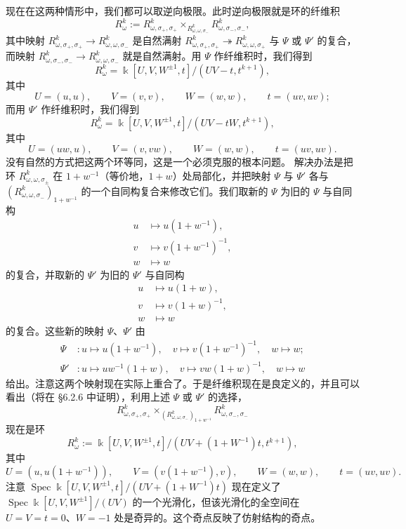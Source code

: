 现在在这两种情形中，我们都可以取逆向极限。此时逆向极限就是环的纤维积
\[
R^k_\omega:=R^k_{\omega,\sigma_+,\sigma_+}\times_{R^k_{\omega,\omega,\sigma_-}}R^k_{\omega,\sigma_-,\sigma_-},
\]
其中映射 $R^k_{\omega,\sigma_+,\sigma_+}\to R^k_{\omega,\omega,\sigma_-}$ 是自然满射 $R^k_{\omega,\sigma_+,\sigma_+}\twoheadrightarrow R^k_{\omega,\omega,\sigma_+}$ 与 $\Psi$ 或 $\Psi'$ 的复合，而映射 $R^k_{\omega,\sigma_-,\sigma_-}\to R^k_{\omega,\omega,\sigma_-}$ 就是自然满射。用 $\Psi$ 作纤维积时，我们得到
\[
R^k_\omega=\Bbbk[U,V,W^{\pm1},t]/(UV-t,t^{k+1}),
\]
其中
\[
U=(u,u),\qquad V=(v,v),\qquad W=(w,w),\qquad t=(uv,uv);
\]
而用 $\Psi'$ 作纤维积时，我们得到
\[
R^k_\omega=\Bbbk[U,V,W^{\pm1},t]/(UV-tW,t^{k+1}),
\]
其中
\[
U=(uw,u),\qquad V=(v,vw),\qquad W=(w,w),\qquad t=(uv,uv).
\]
没有自然的方式把这两个环等同，这是一个必须克服的根本问题。
解决办法是把环 $R^k_{\omega,\omega,\sigma_\pm}$ 在 $1+w^{-1}$（等价地，$1+w$）处局部化，并把映射 $\Psi$ 与 $\Psi'$ 各与 $(R^k_{\omega,\omega,\sigma_-})_{1+w^{-1}}$ 的一个自同构复合来修改它们。我们取新的 $\Psi$ 为旧的 $\Psi$ 与自同构
\begin{align*}
u&\mapsto u(1+w^{-1}),\\
v&\mapsto v(1+w^{-1})^{-1},\\
w&\mapsto w
\end{align*}
的复合，并取新的 $\Psi'$ 为旧的 $\Psi'$ 与自同构
\begin{align*}
u&\mapsto u(1+w),\\
v&\mapsto v(1+w)^{-1},\\
w&\mapsto w
\end{align*}
的复合。这些新的映射 $\Psi$、$\Psi'$ 由
\begin{align*}
\Psi&:u\mapsto u(1+w^{-1}),\quad v\mapsto v(1+w^{-1})^{-1},\quad w\mapsto w;\\
\Psi'&:u\mapsto uw^{-1}(1+w),\quad v\mapsto vw(1+w)^{-1},\quad w\mapsto w
\end{align*}
给出。注意这两个映射现在实际上重合了。于是纤维积现在是良定义的，并且可以看出（将在 §6.2.6 中证明），利用上述 $\Psi$ 或 $\Psi'$ 的选择，
\[
R^k_{\omega,\sigma_+,\sigma_+}\times_{(R^k_{\omega,\omega,\sigma_-})_{1+w^{-1}}}R^k_{\omega,\sigma_-,\sigma_-}
\]
现在是环
\[
R^k_\omega:=\Bbbk[U,V,W^{\pm1},t]/(UV+(1+W^{-1})t,t^{k+1}),
\]
其中
\[
U=(u,u(1+w^{-1})),\qquad V=(v(1+w^{-1}),v),\qquad W=(w,w),\qquad t=(uv,uv).
\]
注意 $\operatorname{Spec}\Bbbk[U,V,W^{\pm1},t]/(UV+(1+W^{-1})t)$ 现在定义了 $\operatorname{Spec}\Bbbk[U,V,W^{\pm1}]/(UV)$ 的一个光滑化，但该光滑化的全空间在 $U=V=t=0$、$W=-1$ 处是奇异的。这个奇点反映了仿射结构的奇点。

